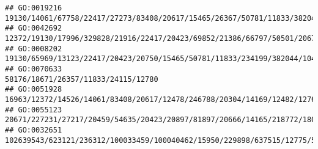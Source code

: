 \documentclass[
]{article}
\begin{document}
\begin{verbatim}
## GO:0019216                                                                                                                                                                                                                                                                 19130/14061/67758/22417/27273/83408/20617/15465/26367/50781/11833/382044/104158/13897/11808/66113/103142/12684/11815/77596/16149/14419/11551
## GO:0042692                                                                                                                                                                                                                                      12372/19130/17996/329828/21916/22417/20423/69852/21386/66797/50501/20679/235130/244810/50876/109272/17268/18858/20307/14422/20474/65256/14165/218772/18092/21380/225288
## GO:0008202                                                                                                                                                                                                                                                                     19130/65969/13123/22417/20423/20750/15465/50781/11833/234199/382044/104158/13897/11808/66113/103142/16204/18858/105387/58226/13078/14419
## GO:0070633                                                                                                                                                                                                                                                                                                                                                                          58176/18671/26357/11833/24115/12780
## GO:0051928                                                                                                                                                                                                                                                                                                                                     16963/12372/14526/14061/83408/20617/12478/246788/20304/14169/12482/12766
## GO:0055123                                                                                                                                                                                                                                                                                                                             20671/227231/27217/20459/54635/20423/20897/81897/20666/14165/218772/18092/331063
## GO:0032651                                                                                                                                                                                                                                                                                                                                  102639543/623121/236312/100033459/100040462/15950/229898/637515/12775/54483

\end{verbatim}
\end{document}

